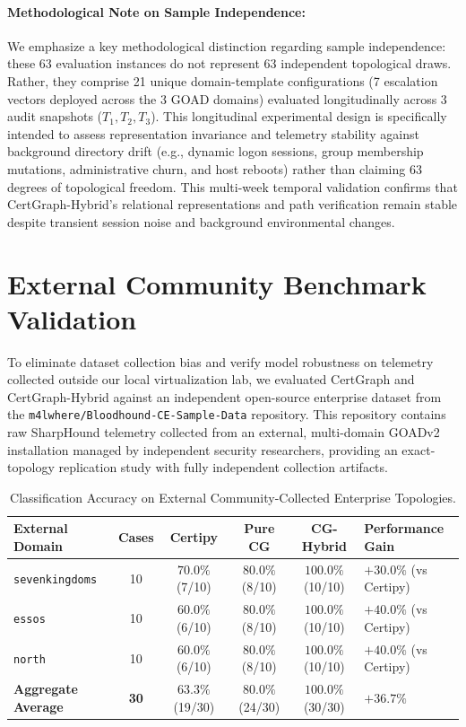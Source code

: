 \paragraph{Methodological Note on Sample Independence:}
We emphasize a key methodological distinction regarding sample independence: these 63 evaluation instances do not represent 63 independent topological draws. Rather, they comprise 21 unique domain-template configurations (7 escalation vectors deployed across the 3 GOAD domains) evaluated longitudinally across 3 audit snapshots ($T_1, T_2, T_3$). This longitudinal experimental design is specifically intended to assess representation invariance and telemetry stability against background directory drift (e.g., dynamic logon sessions, group membership mutations, administrative churn, and host reboots) rather than claiming 63 degrees of topological freedom. This multi-week temporal validation confirms that CertGraph-Hybrid's relational representations and path verification remain stable despite transient session noise and background environmental changes.

\section{External Community Benchmark Validation}
To eliminate dataset collection bias and verify model robustness on telemetry collected outside our local virtualization lab, we evaluated CertGraph and CertGraph-Hybrid against an independent open-source enterprise dataset from the \texttt{m4lwhere/Bloodhound-CE-Sample-Data} repository. This repository contains raw SharpHound telemetry collected from an external, multi-domain GOADv2 installation managed by independent security researchers, providing an exact-topology replication study with fully independent collection artifacts.

\begin{table}[ht]
\centering
\small
\caption{Classification Accuracy on External Community-Collected Enterprise Topologies.}
\label{tab:community_results}
\begin{tabularx}{\textwidth}{p{3.2cm} c c c c X}
\toprule
\textbf{External Domain} & \textbf{Cases} & \textbf{Certipy} & \textbf{Pure CG} & \textbf{CG-Hybrid} & \textbf{Performance Gain} \\
\midrule
\texttt{sevenkingdoms} & 10 & $70.0\%$ (7/10) & $80.0\%$ (8/10) & $\mathbf{100.0\%}$ (10/10) & $+30.0\%$ (vs Certipy) \\
\texttt{essos} & 10 & $60.0\%$ (6/10) & $80.0\%$ (8/10) & $\mathbf{100.0\%}$ (10/10) & $+40.0\%$ (vs Certipy) \\
\texttt{north} & 10 & $60.0\%$ (6/10) & $80.0\%$ (8/10) & $\mathbf{100.0\%}$ (10/10) & $+40.0\%$ (vs Certipy) \\
\midrule
\textbf{Aggregate Average} & \textbf{30} & $\mathbf{63.3\%}$ (19/30) & $\mathbf{80.0\%}$ (24/30) & $\mathbf{100.0\%}$ (30/30) & $\mathbf{+36.7\%}$ \\
\bottomrule
\end{tabularx}
\end{table}

